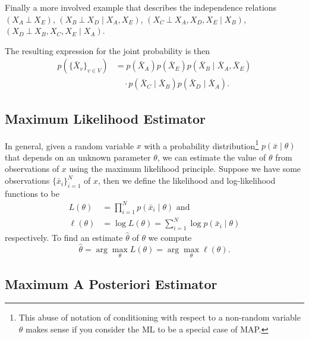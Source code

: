 \documentclass[a4paper]{article}
\newcommand{\given}{\mid}
\newcommand{\ind}{~\bot~} %
\theoremstyle{plain}
\theoremstyle{definition}
\theoremstyle{remark}
\begin{document}
Finally a more involved example that describes the independence relations
$(X_A \ind X_E)$, $(X_B \ind X_D \given X_A, X_E)$, $(X_C \ind X_A, X_D, X_E
\given X_B)$, $(X_D \ind X_B, X_C, X_E \given X_A)$.

\begin{center}
\end{center}
The resulting expression for the joint probability is then
\begin{align*}
  p(\{\bar{X}_v\}_{v\in V}) &= 
    p(\bar{X}_A) p(\bar{X}_E) p(\bar{X}_B \given \bar{X}_A, \bar{X}_E) \\
    &\quad\cdot p(\bar{X}_C \given \bar{X}_B) p(\bar{X}_D \given \bar{X}_A).
\end{align*}

\subsection{Maximum Likelihood Estimator}

In general, given a random variable $x$ with a probability
distribution\footnote{This abuse of notation of conditioning with respect to a
non-random variable $\theta$ makes sense if you consider the ML to be a
special case of MAP.} $p(\bar{x} \given \theta)$ that depends on an unknown
parameter $\theta$, we can estimate the value of $\theta$ from observations of
$x$ using the maximum likelihood principle. Suppose we have some observations
$\{\bar{x}_i\}_{i=1}^N$ of $x$, then we define the likelihood and
log-likelihood functions to be
\begin{align*}
  L(\theta) &= \prod_{i=1}^N p(\bar{x}_i \given \theta) \text{ and}\\
  \ell(\theta) &= \log L(\theta) = \sum_{i=1}^N \log p(\bar{x}_i \given \theta)
\end{align*}
respectively. To find an estimate $\hat{\theta}$ of $\theta$ we compute
\[
  \hat{\theta} = \arg\max_\theta L(\theta) = \arg\max_\theta \ell(\theta).
\]

\subsection{Maximum A Posteriori Estimator}
\end{document}
